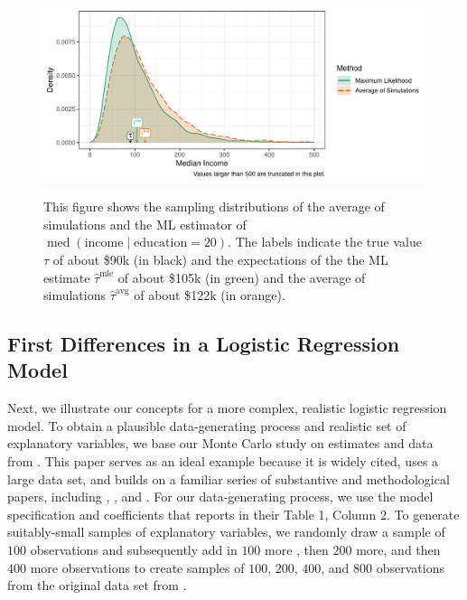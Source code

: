 \documentclass[11pt]{article}
\DeclareMathOperator{\med}{med}
\begin{document}
\begin{figure}[h!]
\begin{center}
\includegraphics[scale = 0.75]{figs/rainey-2017-density.pdf}\\
\vspace{.1in}
\caption{This figure shows the sampling distributions of the average of simulations and the ML estimator of $\med(\text{income} \mid \text{education} = 20)$. The labels indicate the true value $\tau$ of about \$90k (in black) and the expectations of the the ML estimate $\hat{\tau}^\text{mle}$ of about \$105k (in green) and the average of simulations $\hat{\tau}^\text{avg}$ of about \$122k (in orange).}\label{fig:rainey-2017-density}
\end{center}
\end{figure}

\subsection*{First Differences in a Logistic Regression Model}

Next, we illustrate our concepts for a more complex, realistic logistic regression model. 
To obtain a plausible data-generating process and realistic set of explanatory variables, we base our Monte Carlo study on estimates and data from \cite{BerryDeMerittEsarey2010}. 
This paper serves as an ideal example because it is widely cited, uses a large data set, and builds on a familiar series of substantive and methodological papers, including \cite{WolfingerRosenstone1980}, \cite{Nagler1991, Nagler1994}, and \cite{AltmanMcDonald2003}.
For our data-generating process, we use the model specification and coefficients that \cite{BerryDeMerittEsarey2010} reports in their Table 1, Column 2. 
To generate suitably-small samples of explanatory variables, we randomly draw a sample of $100$ observations and subsequently add in $100$ more , then $200$ more, and then $400$ more observations to create samples of $100$, $200$, $400$, and $800$ observations from the original data set from \cite{BerryDeMerittEsarey2010}.
\end{document}
